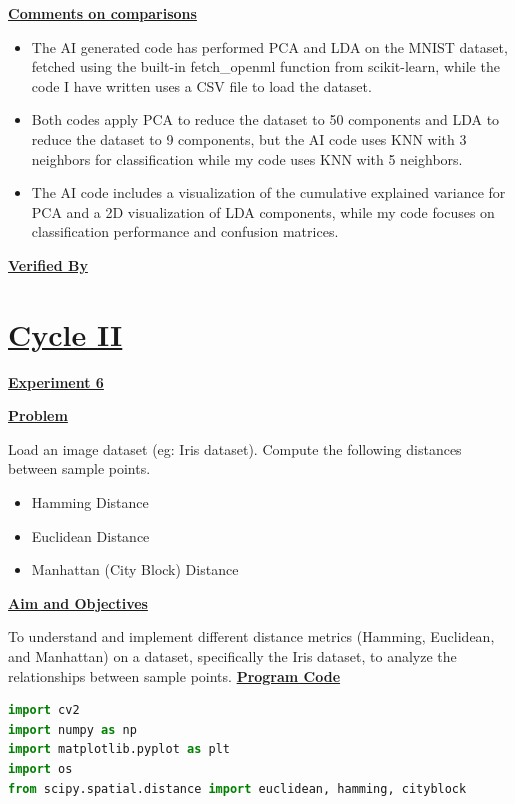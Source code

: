 \documentclass[a4paper,12pt]{article}
\begin{document}
\noindent
\textbf{\underline{Comments on comparisons}}
\noindent
\begin{itemize}
    \item The AI generated code has performed PCA and LDA on the MNIST dataset, fetched using the built-in fetch\_openml function from scikit-learn, while the code I have written uses a CSV file to load the dataset.
    \item Both codes apply PCA to reduce the dataset to 50 components and LDA to reduce the dataset to 9 components, but the AI code uses KNN with 3 neighbors for classification while my code uses KNN with 5 neighbors.
    \item The AI code includes a visualization of the cumulative explained variance for PCA and a 2D visualization of LDA components, while my code focuses on classification performance and confusion matrices.
\end{itemize}
\vfill
\noindent
\textbf{\underline{Verified By}}
\noindent
\vspace{3em}

\newpage

\section*{\underline{Cycle II}}
\begin{center}
\textbf{\underline{Experiment 6}}
\label{exp6}
\end{center}

\vspace{1em}
\noindent
\textbf{\underline{Problem}}\par
\noindent
Load an image dataset (eg: Iris dataset). Compute the following distances between sample points.
\begin{itemize}
  \item Hamming Distance
  \item Euclidean Distance
  \item Manhattan (City Block) Distance
\end{itemize}


\vspace{1em}
\noindent
\textbf{\underline{Aim and Objectives}}\par
\noindent
To understand and implement different distance metrics (Hamming, Euclidean, and Manhattan) on a dataset, specifically the Iris dataset, to analyze the relationships between sample points.
\vspace{1em}
\noindent
\textbf{\underline{Program Code}}
\noindent
\begin{lstlisting}[language=Python]
import cv2
import numpy as np
import matplotlib.pyplot as plt
import os
from scipy.spatial.distance import euclidean, hamming, cityblock

\end{lstlisting}
\end{document}
